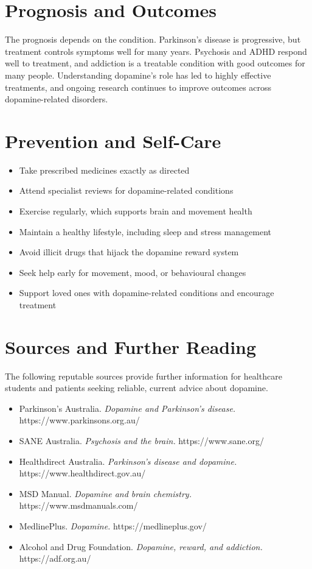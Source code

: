 \section*{Prognosis and Outcomes}
The prognosis depends on the condition. Parkinson's disease is progressive, but treatment controls symptoms well for many years. Psychosis and ADHD respond well to treatment, and addiction is a treatable condition with good outcomes for many people. Understanding dopamine's role has led to highly effective treatments, and ongoing research continues to improve outcomes across dopamine-related disorders.

\section*{Prevention and Self-Care}
\begin{itemize}
    \item Take prescribed medicines exactly as directed
    \item Attend specialist reviews for dopamine-related conditions
    \item Exercise regularly, which supports brain and movement health
    \item Maintain a healthy lifestyle, including sleep and stress management
    \item Avoid illicit drugs that hijack the dopamine reward system
    \item Seek help early for movement, mood, or behavioural changes
    \item Support loved ones with dopamine-related conditions and encourage treatment
\end{itemize}

\section*{Sources and Further Reading}
The following reputable sources provide further information for healthcare students and patients seeking reliable, current advice about dopamine.

\begin{itemize}
    \item Parkinson's Australia. \textit{Dopamine and Parkinson's disease.} https://www.parkinsons.org.au/
    \item SANE Australia. \textit{Psychosis and the brain.} https://www.sane.org/
    \item Healthdirect Australia. \textit{Parkinson's disease and dopamine.} https://www.healthdirect.gov.au/
    \item MSD Manual. \textit{Dopamine and brain chemistry.} https://www.msdmanuals.com/
    \item MedlinePlus. \textit{Dopamine.} https://medlineplus.gov/
    \item Alcohol and Drug Foundation. \textit{Dopamine, reward, and addiction.} https://adf.org.au/
\end{itemize}
